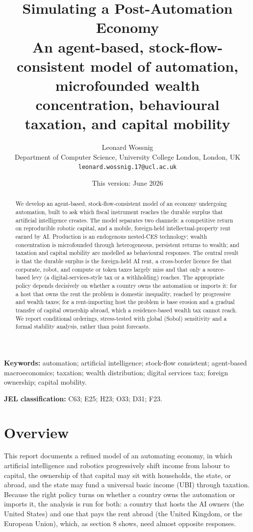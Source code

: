 \documentclass[12pt]{article}
\title{\textbf{Simulating a Post-Automation Economy}\\[4pt]
\large An agent-based, stock-flow-consistent model of automation, microfounded wealth concentration, behavioural taxation, and capital mobility}
\author{Leonard Wossnig \\ {\normalsize Department of Computer Science, University College London, London, UK} \\ {\normalsize \texttt{leonard.wossnig.17@ucl.ac.uk}}}
\date{This version: June 2026}
\begin{document}
\maketitle
\begin{abstract}
\noindent We develop an agent-based, stock-flow-consistent model of an economy undergoing automation, built to ask which fiscal instrument reaches the durable surplus that artificial intelligence creates. The model separates two channels: a competitive return on reproducible robotic capital, and a mobile, foreign-held intellectual-property rent earned by AI. Production is an endogenous nested-CES technology; wealth concentration is microfounded through heterogeneous, persistent returns to wealth; and taxation and capital mobility are modelled as behavioural responses. The central result is that the durable surplus is the foreign-held AI rent, a cross-border licence fee that corporate, robot, and compute or token taxes largely miss and that only a source-based levy (a digital-services-style tax or a withholding) reaches. The appropriate policy depends decisively on whether a country owns the automation or imports it: for a host that owns the rent the problem is domestic inequality, reached by progressive and wealth taxes; for a rent-importing host the problem is base erosion and a gradual transfer of capital ownership abroad, which a residence-based wealth tax cannot reach. We report conditional orderings, stress-tested with global (Sobol) sensitivity and a formal stability analysis, rather than point forecasts.
\end{abstract}

\vspace{0.3em}
\noindent\textbf{Keywords:} automation; artificial intelligence; stock-flow consistent; agent-based macroeconomics; taxation; wealth distribution; digital services tax; foreign ownership; capital mobility.

\vspace{0.2em}
\noindent\textbf{JEL classification:} C63; E25; H23; O33; D31; F23.
\vspace{0.6em}

\hypertarget{overview}{%
\section{Overview}\label{overview}}

This report documents a refined model of an automating economy, in which
artificial intelligence and robotics progressively shift income from
labour to capital, the ownership of that capital may sit with
households, the state, or abroad, and the state may fund a universal
basic income (UBI) through taxation. Because the right policy turns on
whether a country owns the automation or imports it, the analysis is run
for both: a country that hosts the AI owners (the United States) and one
that pays the rent abroad (the United Kingdom, or the European Union),
which, as section 8 shows, need almost opposite responses.
\end{document}
